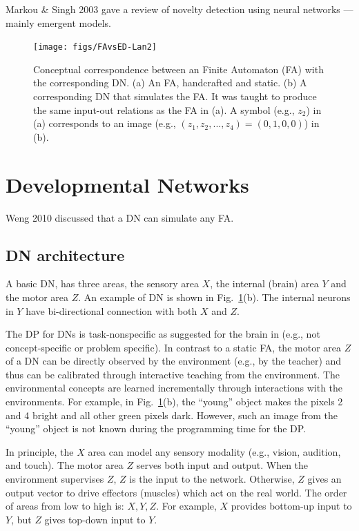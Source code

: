 \documentclass[conference]{IEEEtran}
\begin{document}
Markou \& Singh 2003 \cite{Markou03} gave a review of novelty detection using neural networks --- mainly 
emergent models. 


\begin{figure}[tb]
     \centering
      \texttt{[image: figs/FAvsED-Lan2]}
\caption{\protect\small  Conceptual correspondence between an Finite Automaton (FA) with the
corresponding DN.   (a) An FA, handcrafted and static.  
(b)  A corresponding DN that simulates the FA. 
 It was taught to produce the same input-out relations as the FA in (a).
A symbol (e.g., $z_2$) in (a) corresponds to an image (e.g., $(z_1, z_2, ... , z_4) = (0, 1, 0, 0)$) in (b).
}
 \label{FG:FAvsED}
\end{figure} 

\section{Developmental Networks}
\label{SE:DN}
Weng 2010 \cite{WengIJCNN10} discussed that
a DN can simulate any FA.   

\subsection{DN architecture}

A basic DN, has three areas, the sensory area $X$, the internal (brain) area $Y$ and the motor area $Z$.
An example of DN is shown in Fig.~\ref{FG:FAvsED}(b).   
The internal neurons in $Y$ have bi-directional connection with both $X$ and $Z$.  

The DP for DNs is task-nonspecific as suggested for the brain in \cite{WengScience} 
(e.g., not concept-specific or problem specific).   
In contrast to a static FA, the motor area $Z$ of a DN can be directly observed by the environment (e.g., by the teacher) and thus can be calibrated through interactive teaching from the environment.   
The environmental concepts are learned incrementally through interactions with the environments.  
For example, in Fig.~\ref{FG:FAvsED}(b), the ``young'' object makes the pixels 2 and 4 bright and all other green pixels dark.  However, such 
an image from the ``young'' object is not known during the programming time for the DP.   

In principle, the $X$ area can model any sensory modality (e.g., vision, audition, and touch). 
The motor area $Z$ serves both input and output.  When the environment supervises $Z$, $Z$ is the input
to the network.  Otherwise, $Z$ gives an output vector to drive effectors (muscles) which act on the real world. 
The order of areas from low to high is: $X, Y, Z$.   For example, 
$X$ provides bottom-up input to $Y$, but $Z$ gives top-down input to $Y$.  
\end{document}
